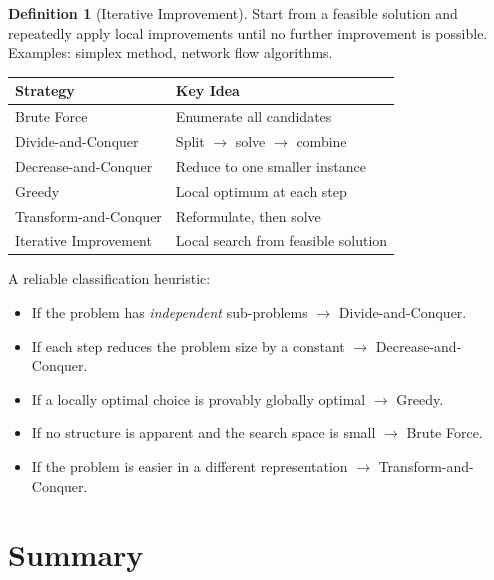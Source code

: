 \documentclass[11pt, a4paper, notitlepage]{report}
\theoremstyle{definition}
\newtheorem{definition}[theorem]{Definition}
\theoremstyle{remark}
\theoremstyle{definition}
\begin{document}
\begin{definition}[Iterative Improvement]
Start from a feasible solution and repeatedly apply local improvements until no further
improvement is possible.  Examples: simplex method, network flow algorithms.
\end{definition}

\begin{center}
\begin{tabular}{@{}ll@{}}
\toprule
\textbf{Strategy} & \textbf{Key Idea} \\
\midrule
Brute Force          & Enumerate all candidates \\
Divide-and-Conquer   & Split $\to$ solve $\to$ combine \\
Decrease-and-Conquer & Reduce to one smaller instance \\
Greedy               & Local optimum at each step \\
Transform-and-Conquer & Reformulate, then solve \\
Iterative Improvement & Local search from feasible solution \\
\bottomrule
\end{tabular}
\end{center}

\begin{examtip}[title={Exam Tip: Recognising the Right Paradigm}]
A reliable classification heuristic:
\begin{itemize}
  \item If the problem has \emph{independent} sub-problems $\to$ Divide-and-Conquer.
  \item If each step reduces the problem size by a constant $\to$ Decrease-and-Conquer.
  \item If a locally optimal choice is provably globally optimal $\to$ Greedy.
  \item If no structure is apparent and the search space is small $\to$ Brute Force.
  \item If the problem is easier in a different representation $\to$ Transform-and-Conquer.
\end{itemize}
\end{examtip}

\section{Summary}
\label{sec:algo-intro-summary}
\end{document}

